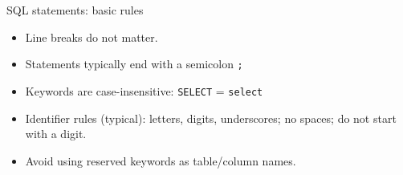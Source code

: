 \documentclass[10pt,aspectratio=169]{beamer}
\begin{document}
\begin{frame}{SQL statements: basic rules}
\begin{itemize}
  \item Line breaks do not matter.
  \item Statements typically end with a semicolon \texttt{;}
  \item Keywords are case-insensitive: \texttt{SELECT} = \texttt{select}
  \item Identifier rules (typical): letters, digits, underscores; no spaces; do not start with a digit.
  \item Avoid using reserved keywords as table/column names.
\end{itemize}
\end{frame}

\end{document}
